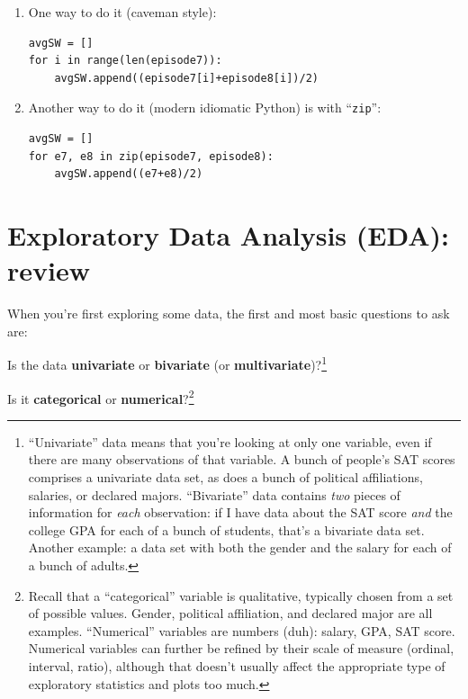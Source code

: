 \begin{enumerate}
\itemsep.1em
\item One way to do it (caveman style):
\begin{Verbatim}[fontsize=\small,samepage=true,frame=single]
avgSW = []
for i in range(len(episode7)):
    avgSW.append((episode7[i]+episode8[i])/2)
\end{Verbatim}

\item Another way to do it (modern idiomatic Python) is with ``\texttt{zip}'':
\begin{Verbatim}[fontsize=\small,samepage=true,frame=single]
avgSW = []
for e7, e8 in zip(episode7, episode8):
    avgSW.append((e7+e8)/2)
\end{Verbatim}

\end{enumerate}
\section{Exploratory Data Analysis (EDA): review}

When you're first exploring some data, the first and most basic questions to
ask are:

\begin{compactenum}

\item Is the data \textbf{univariate} or \textbf{bivariate} (or
\textbf{multivariate})?\footnote{``Univariate'' data means that you're looking
at only one variable, even if there are many observations of that variable. A
bunch of people's SAT scores comprises a univariate data set, as does a bunch
of political affiliations, salaries, or declared majors. ``Bivariate'' data
contains \textit{two} pieces of information for \textit{each} observation: if
I have data about the SAT score \textit{and} the college GPA for each of a
bunch of students, that's a bivariate data set. Another example: a data set
with both the gender and the salary for each of a bunch of adults.}

\item Is it \textbf{categorical} or \textbf{numerical}?\footnote{Recall that a
``categorical'' variable is qualitative, typically chosen from a set of
possible values. Gender, political affiliation, and declared major are all
examples. ``Numerical'' variables are numbers (duh): salary, GPA, SAT score.
Numerical variables can further be refined by their scale of measure (ordinal,
interval, ratio), although that doesn't usually affect the appropriate type of
exploratory statistics and plots too much.}

\end{compactenum}


